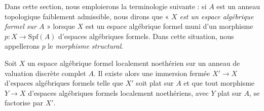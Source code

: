 \noindent
Dans cette section, nous emploierons la terminologie suivante :
si $A$ est un anneau topologique faiblement admissible, nous
dirons que « {\it $X$ est un espace algébrique formel sur $A$} » lorsque $X$
est un espace algébrique formel muni d'un
morphisme $p : X \to \text{Spf}(A)$ d'espaces algébriques formels.
Dans cette situation, nous appellerons $p$ le {\it morphisme structural}.

\begin{lemma}
\label{lemma-flat-locus}
Soit $X$ un espace algébrique formel localement noethérien sur
un anneau de valuation discrète complet $A$.
Il existe alors une immersion fermée $X' \to X$
d'espaces algébriques formels telle que $X'$ soit plat sur $A$
et que tout morphisme $Y \to X$ d'espaces algébriques formels localement
noethériens, avec $Y$ plat sur $A$, se factorise par $X'$.
\end{lemma}

